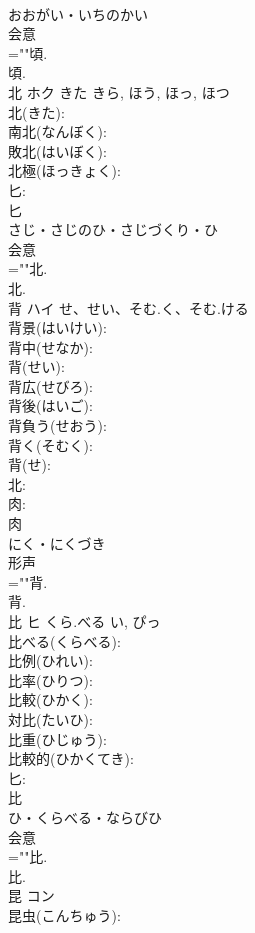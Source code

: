 \documentclass[8pt]{extreport}
\begin{document}
\begin{CJK}{UTF8}{min}
\\	おおがい・いちのかい	
\\	会意 
\\	=""頃.
\\	頃.
\\	北	ホク	きた	きら, ほう, ほっ, ほつ	
\\	北(きた): 
\\	南北(なんぼく): 
\\	敗北(はいぼく): 
\\	北極(ほっきょく): 
\\	匕: 
\\	匕	
\\	さじ・さじのひ・さじづくり・ひ	
\\	会意 
\\	=""北.
\\	北.
\\	背	ハイ	せ、せい、そむ.く、そむ.ける		
\\	背景(はいけい): 
\\	背中(せなか): 
\\	背(せい): 
\\	背広(せびろ): 
\\	背後(はいご): 
\\	背負う(せおう): 
\\	背く(そむく): 
\\	背(せ): 
\\	北: 
\\	肉: 
\\	肉	
\\	にく・にくづき	
\\	形声 
\\	=""背.
\\	背.
\\	比	ヒ	くら.べる	い, ぴっ	
\\	比べる(くらべる): 
\\	比例(ひれい): 
\\	比率(ひりつ): 
\\	比較(ひかく): 
\\	対比(たいひ): 
\\	比重(ひじゅう): 
\\	比較的(ひかくてき): 
\\	匕: 
\\	比	
\\	ひ・くらべる・ならびひ	
\\	会意 
\\	=""比.
\\	比.
\\	昆	コン			
\\	昆虫(こんちゅう): 

\end{CJK}
\end{document}
